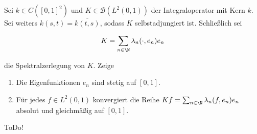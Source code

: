 \begin{exercise}[37/1]

Sei $k \in C([0, 1]^2)$ und $K \in \mathcal{B}(L^2(0, 1))$ der Integraloperator mit Kern $k$.
Sei weiters $k(s, t) = \overline{k(t, s)}$, sodass $K$ selbstadjungiert ist.
Schließlich sei

\begin{align*}
  K
  =
  \sum_{n \in \N}
  \lambda_n
  (\cdot, e_n)
  e_n
\end{align*}

die Spektralzerlegung von $K$.
Zeige

\begin{enumerate}[label = (\alph*)]

  \item
  Die Eigenfunktionen $e_n$ sind stetig auf $[0, 1]$.

  \item
  Für jedes $f \in L^2(0, 1)$ konvergiert die Reihe $K f = \sum_{n \in \N} \lambda_n (f, e_n) e_n$ absolut und gleichmäßig auf $[0, 1]$.

\end{enumerate}

\end{exercise}

\begin{solution}

ToDo!

\end{solution}
